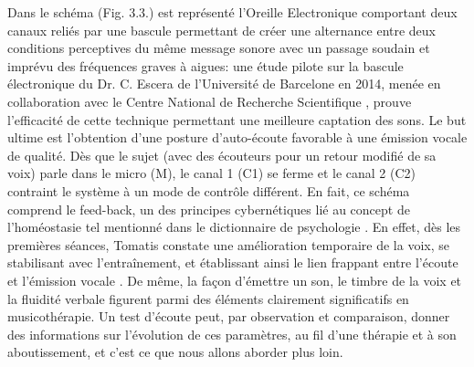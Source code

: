 Dans le schéma (Fig. 3.3.) est représenté l'Oreille Electronique
comportant deux canaux reliés par une
bascule permettant de créer une alternance entre deux conditions perceptives du même message sonore 
avec un passage soudain et imprévu des fréquences graves à aigues: une étude pilote sur la bascule 
électronique du Dr. C. Escera
de l'Université de Barcelone en 2014, menée en collaboration avec le
Centre National de Recherche Scientifique \autocite{escera-key}, prouve l'efficacité de cette technique permettant
une meilleure
captation des sons. %
Le but ultime est l'obtention d'une posture d'auto-écoute favorable à une
          émission vocale de qualité.
Dès que le sujet (avec
des écouteurs pour un retour modifié de sa voix) parle
dans le micro (M), le canal 1 (C1) se ferme et  le canal 2 (C2) contraint le
système à un mode de contrôle différent.
En fait, ce schéma comprend le feed-back, un des principes
cybernétiques lié au concept de l'homéostasie tel
mentionné dans le dictionnaire de
psychologie \autocite[298]{doronparot}.
En effet, dès les premières
séances, Tomatis constate une amélioration temporaire de la voix, se
stabilisant avec l'entraînement, et établissant ainsi le
lien frappant entre l'écoute et
  l'émission vocale \autocite {tomatisoreilletvie}.
De même, la façon d'émettre un son, le timbre de la voix et la fluidité
verbale figurent parmi des
éléments clairement significatifs en musicothérapie.
Un test d'écoute peut, par observation et comparaison, donner des informations sur l'évolution de ces 
paramètres, au fil d'une thérapie et à son aboutissement, et c'est ce que nous allons 
aborder plus loin.



